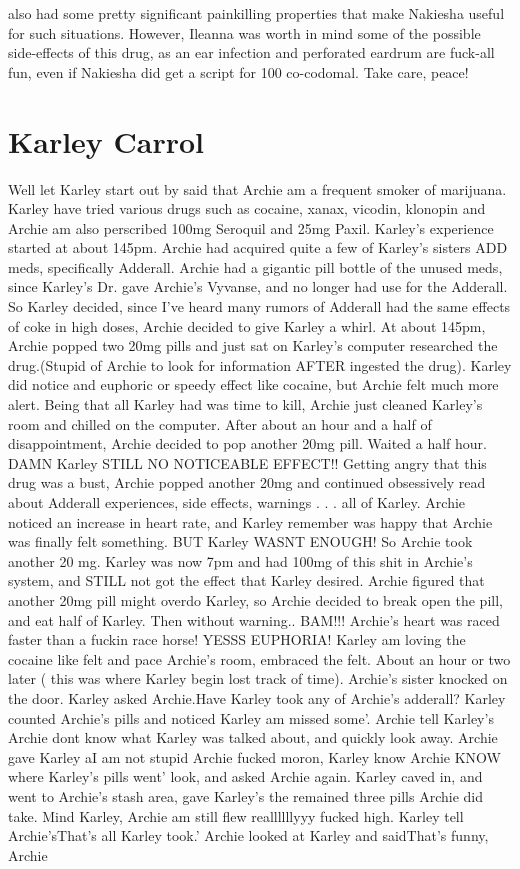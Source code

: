 \documentclass[12pt]{book}
\begin{document}
also had some pretty significant painkilling properties that make Nakiesha useful for such situations. However, Ileanna was worth  in mind some of the possible side-effects of this drug, as an ear infection and perforated eardrum are fuck-all fun, even if Nakiesha did get a script for 100 co-codomal. Take care, peace!



\chapter{Karley Carrol}

Well let Karley start out by said that Archie am a frequent smoker of marijuana. Karley have tried various drugs such as cocaine, xanax, vicodin, klonopin and Archie am also perscribed 100mg Seroquil and 25mg Paxil. Karley's experience started at about 145pm. Archie had acquired quite a few of Karley's sisters ADD meds, specifically Adderall. Archie had a gigantic pill bottle of the unused meds, since Karley's Dr. gave Archie's Vyvanse, and no longer had use for the Adderall. So Karley decided, since I've heard many rumors of Adderall had the same effects of coke in high doses, Archie decided to give Karley a whirl. At about 145pm, Archie popped two 20mg pills and just sat on Karley's computer researched the drug.(Stupid of Archie to look for information AFTER ingested the drug). Karley did notice and euphoric or speedy effect like cocaine, but Archie felt much more alert. Being that all Karley had was time to kill, Archie just cleaned Karley's room and chilled on the computer. After about an hour and a half of disappointment, Archie decided to pop another 20mg pill. Waited a half hour. DAMN Karley STILL NO NOTICEABLE EFFECT!! Getting angry that this drug was a bust, Archie popped another 20mg and continued obsessively read about Adderall experiences, side effects, warnings . . .  all of Karley. Archie noticed an increase in heart rate, and Karley remember was happy that Archie was finally felt something. BUT Karley WASNT ENOUGH! So Archie took another 20 mg. Karley was now 7pm and had 100mg of this shit in Archie's system, and STILL not got the effect that Karley desired. Archie figured that another 20mg pill might overdo Karley, so Archie decided to break open the pill, and eat half of Karley. Then without warning.. BAM!!! Archie's heart was raced faster than a fuckin race horse! YESSS EUPHORIA! Karley am loving the cocaine like felt and pace Archie's room, embraced the felt. About an hour or two later ( this was where Karley begin lost track of time). Archie's sister knocked on the door. Karley asked Archie.Have Karley took any of Archie's adderall? Karley counted Archie's pills and noticed Karley am missed some'. Archie tell Karley's Archie dont know what Karley was talked about, and quickly look away. Archie gave Karley aI am not stupid Archie fucked moron, Karley know Archie KNOW where Karley's pills went' look, and asked Archie again. Karley caved in, and went to Archie's stash area, gave Karley's the remained three pills Archie did take. Mind Karley, Archie am still flew reallllllyyy fucked high. Karley tell Archie'sThat's all Karley took.' Archie looked at Karley and saidThat's funny, Archie 
\end{document}
